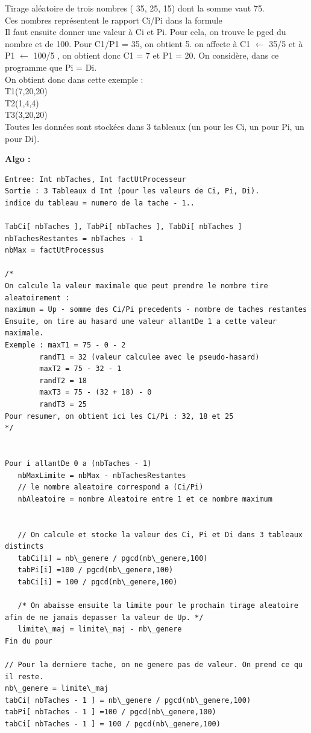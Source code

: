 		    Tirage aléatoire de trois nombres ( 35, 25, 15) dont la somme vaut 75. \\
		    Ces nombres représentent le rapport Ci/Pi dans la formule  \\
		    Il faut ensuite donner une valeur à Ci et Pi. Pour cela, on trouve le pgcd du nombre et de 100. Pour C1/P1 = 35, on obtient 5.  on affecte à C1 $\leftarrow$ 35/5 et à P1 $\leftarrow$ 100/5 , on obtient donc C1 = 7 et P1 = 20. On considère, dans ce programme que Pi = Di. \\
		    
		    On obtient donc dans cette exemple :  \\
		    T1(7,20,20) \\
		    T2(1,4,4) \\
		    T3(3,20,20) \\

		    Toutes les données sont stockées dans 3 tableaux (un pour les Ci, un pour Pi, un pour Di). 

		\textbf{Algo :}
			\begin{lstlisting}
Entree: Int nbTaches, Int factUtProcesseur
Sortie : 3 Tableaux d Int (pour les valeurs de Ci, Pi, Di). 
indice du tableau = numero de la tache - 1..

TabCi[ nbTaches ], TabPi[ nbTaches ], TabDi[ nbTaches ]
nbTachesRestantes = nbTaches - 1
nbMax = factUtProcessus 

/*
On calcule la valeur maximale que peut prendre le nombre tire aleatoirement :
maximum = Up - somme des Ci/Pi precedents - nombre de taches restantes
Ensuite, on tire au hasard une valeur allantDe 1 a cette valeur maximale.
Exemple : maxT1 = 75 - 0 - 2
	    randT1 = 32 (valeur calculee avec le pseudo-hasard)
	    maxT2 = 75 - 32 - 1
	    randT2 = 18
	    maxT3 = 75 - (32 + 18) - 0
	    randT3 = 25
Pour resumer, on obtient ici les Ci/Pi : 32, 18 et 25
*/


Pour i allantDe 0 a (nbTaches - 1)
   nbMaxLimite = nbMax - nbTachesRestantes
   // le nombre aleatoire correspond a (Ci/Pi)
   nbAleatoire = nombre Aleatoire entre 1 et ce nombre maximum


   // On calcule et stocke la valeur des Ci, Pi et Di dans 3 tableaux distincts
   tabCi[i] = nb\_genere / pgcd(nb\_genere,100)
   tabPi[i] =100 / pgcd(nb\_genere,100)
   tabCi[i] = 100 / pgcd(nb\_genere,100)
	        
   /* On abaisse ensuite la limite pour le prochain tirage aleatoire afin de ne jamais depasser la valeur de Up. */
   limite\_maj = limite\_maj - nb\_genere
Fin du pour

// Pour la derniere tache, on ne genere pas de valeur. On prend ce qu il reste.
nb\_genere = limite\_maj
tabCi[ nbTaches - 1 ] = nb\_genere / pgcd(nb\_genere,100)
tabPi[ nbTaches - 1 ] =100 / pgcd(nb\_genere,100)
tabCi[ nbTaches - 1 ] = 100 / pgcd(nb\_genere,100)
			\end{lstlisting}

